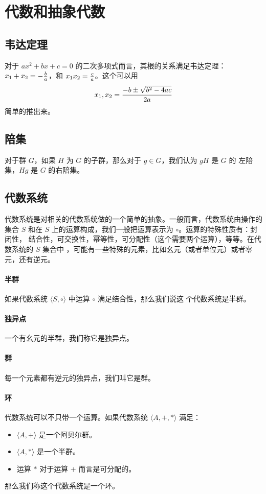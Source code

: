 \chapter{代数和抽象代数}

\section{韦达定理}
对于 $ax^2 + bx + c = 0$ 的二次多项式而言，其根的关系满足韦达定理：$x_1 + x_2 =
- {b \over a}$，和 $x_1 x_2 = {c \over a}$。这个可以用 $$x_1, x_2 = {-b \pm
\sqrt{b^2 -4ac} \over 2a}$$ 简单的推出来。

\section{陪集}
对于群 $G$，如果 $H$ 为 $G$ 的子群，那么对于 $g \in G$，我们认为 $gH$ 是 $G$ 的
左陪集，$Hg$ 是 $G$ 的右陪集。

\section{代数系统}
代数系统是对相关的代数系统做的一个简单的抽象。一般而言，代数系统由操作的集合 $S$
和在 $S$ 上的运算构成，我们一般把运算表示为 $\circ$。运算的特殊性质有：封闭性，
结合性，可交换性，幂等性，可分配性（这个需要两个运算），等等。在代数系统的 $S$ 集合中
，可能有一些特殊的元素，比如幺元（或者单位元）或者零元，还有逆元。

\subsubsection{半群}
如果代数系统 $\langle S, \circ \rangle$ 中运算 $\circ$ 满足结合性，那么我们说这
个代数系统是半群。

\subsubsection{独异点}
一个有幺元的半群，我们称它是独异点。

\subsubsection{群}
每一个元素都有逆元的独异点，我们叫它是群。

\subsubsection{环}
代数系统可以不只带一个运算。如果代数系统 $\langle A, +, *\rangle$ 满足：
\begin{itemize}
    \item $\langle A, +\rangle$ 是一个阿贝尔群。
    \item $\langle A, *\rangle$ 是一个半群。
    \item 运算 $*$ 对于运算 $+$ 而言是可分配的。
\end{itemize}

那么我们称这个代数系统是一个环。

